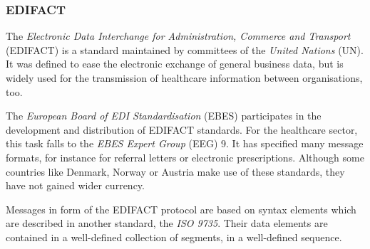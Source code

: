 %
%
%
%
%
%
%

\subsubsection{EDIFACT}
\label{edifact_heading}

The \emph{Electronic Data Interchange for Administration, Commerce and Transport}
(EDIFACT) \cite{edifact} is a standard maintained by committees of the
\emph{United Nations} (UN). It was defined to ease the electronic exchange of
general business data, but is widely used for the transmission of healthcare
information between organisations, too. \cite{kalra1998}

The \emph{European Board of EDI Standardisation} (EBES) participates in the
development and distribution of EDIFACT standards. For the healthcare sector,
this task falls to the \emph{EBES Expert Group} (EEG) 9. It has specified many
message formats, for instance for referral letters or electronic prescriptions.
Although some countries like Denmark, Norway or Austria make use of these
standards, they have not gained wider currency. \cite{atgexpertsreport}

Messages in form of the EDIFACT protocol are based on syntax elements which are
described in another standard, the \emph{ISO 9735}. Their data elements are
contained in a well-defined collection of segments, in a well-defined sequence.
\cite{edifactory}
